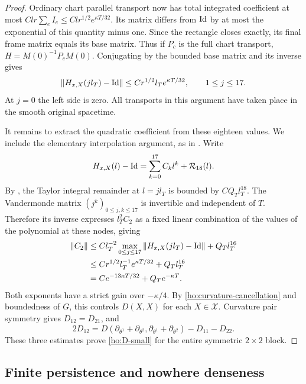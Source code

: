 \begin{proof}
Ordinary chart parallel transport now has total integrated coefficient
at most $C lr\sum_e I_e\le C lr^{1/2}e^{\kappa T/32}$.
Its matrix differs from $\mathrm{Id}$ by at most the exponential of this
quantity minus one.  Since the rectangle closes exactly, its final
frame matrix equals its base matrix.  Thus if $P_c$ is the full chart
transport, $H=M(0)^{-1}P_cM(0)$.  Conjugating by the bounded base matrix
and its inverse gives
\begin{equation}\label{ho:sampled-holonomy}
 \|H_{x,X}(j l_T)-\mathrm{Id}\|
       \le C r^{1/2}l_T e^{\kappa T/32},
                     \qquad 1\le j\le17.
\end{equation}
At $j=0$ the left side is zero.  All transports in this argument have
taken place in the smooth original spacetime.

It remains to extract the quadratic coefficient from these eighteen
values.  We include the elementary interpolation argument, as in
\cite[]{KerrCOne}.  Write
\[
 H_{x,X}(l)-\mathrm{Id}=\sum_{k=0}^{17}C_k l^k+\mathcal R_{18}(l).
\]
By , the Taylor integral remainder at $l=j l_T$
is bounded by $C Q_Tl_T^{18}$.  The Vandermonde matrix
$(j^k)_{0\le j,k\le17}$ is invertible and independent of $T$.
Therefore its inverse expresses $l_T^2 C_2$ as a fixed linear
combination of the values of the polynomial at these nodes, giving
\begin{align}\label{ho:coefficient-estimate}
 \|C_2\|
 &\le C l_T^{-2}\max_{0\le j\le17}
                       \|H_{x,X}(j l_T)-\mathrm{Id}\|+Q_Tl_T^{16}\notag\\
 &\le C r^{1/2}l_T^{-1}e^{\kappa T/32}+Q_Tl_T^{16}\notag\\
 &=C e^{-13\kappa T/32}+Q_Te^{-\kappa T}.
\end{align}
Both exponents have a strict gain over $-\kappa/4$.
By \eqref{ho:curvature-cancellation} and boundedness of $G$, this
controls $D(X,X)$ for each $X\in\mathcal X$.
Curvature pair symmetry gives $D_{12}=D_{21}$, and
\[
 2D_{12}=D(\partial_{\theta^1}+\partial_{\theta^2},
                \partial_{\theta^1}+\partial_{\theta^2})
             -D_{11}-D_{22}.
\]
These three estimates prove \eqref{ho:D-small} for the entire
symmetric $2\times2$ block.
\end{proof}

\subsection{Finite persistence and nowhere denseness}

